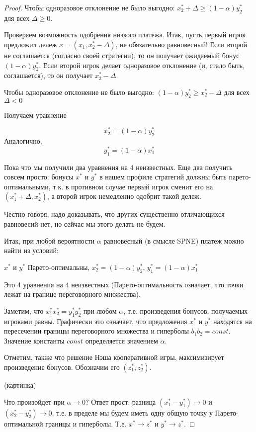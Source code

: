 \begin{proof}
Чтобы одноразовое отклонение не было выгодно: $x_{2}^{*}+\Delta\geq(1-\alpha)y_{2}^{*}$
для всех $\Delta\geq0$. 

Проверяем возможность одобрения низкого платежа. Итак, пусть первый
игрок предложил дележ $x=(x_{1},x_{2}^{*}-\Delta)$, не обязательно
равновесный! Если второй не соглашается (согласно своей стратегии),
то он получает ожидаемый бонус $(1-\alpha)y_{2}^{*}$. Если второй
игрок делает одноразовое отклонение (и, стало быть, соглашается),
то он получает $x_{2}^{*}-\Delta$.

Чтобы одноразовое отклонение не было выгодно: $(1-\alpha)y_{2}^{*}\geq x_{2}^{*}-\Delta$
для всех $\Delta<0$

Получаем уравнение 

\[
x_{2}^{*}=(1-\alpha)y_{2}^{*}\]
 Аналогично, \[
y_{1}^{*}=(1-\alpha)x_{1}^{*}\]


Пока что мы получили два уравнения на 4 неизвестных. Еще два получить
совсем просто: бонусы $x^{*}$ и $y^{*}$ в нашем профиле стратегий
должны быть парето-оптимальными, т.к. в противном случае первый игрок
сменит его на $(x_{1}^{*}+\Delta,x_{2}^{*})$, а второй игрок немедленно
одобрит такой дележ.

Честно говоря, надо доказывать, что других существенно отличающихся
равновесий нет, но сейчас мы этого делать не будем.

Итак, при любой вероятности $\alpha$ равновесный (в смысле SPNE)
платеж можно найти из условий:

$x^{*}$ и $y^{*}$ Парето-оптимальны, $x_{2}^{*}=(1-\alpha)y_{2}^{*}$,
$y_{1}^{*}=(1-\alpha)x_{1}^{*}$ 

Это 4 уравнения на 4 неизвестных (Парето-оптимальность означает, что
точки лежат на границе переговорного множества). 

Заметим, что $x_{1}^{*}x_{2}^{*}=y_{1}^{*}y_{2}^{*}$ при любом $\alpha$,
т.е. произведения бонусов, получаемых игроками равны. Графически это
означает, что предложения $x^{*}$ и $y^{*}$ находятся на пересечении
границы переговорного множества и гиперболы $b_{1}b_{2}=const$.
Значение константы $const$ определяется
значением $\alpha$.

Отметим, также что решение Нэша кооперативной игры, максимизирует
произведение бонусов. Обозначим его $(z_{1}^{*},z_{2}^{*})$.

(картинка)

Что произойдет при $\alpha\to0$? Ответ прост: разница $(x_{1}^{*}-y_{1}^{*})\to0$
и $(x_{2}^{*}-y_{2}^{*})\to0$, т.е. в пределе мы будем иметь одну
общую точку у Парето-оптимальной границы и гиперболы. Т.е. $x^{*}\to z^{*}$
и $y^{*}\to z^{*}$.

\end{proof}


